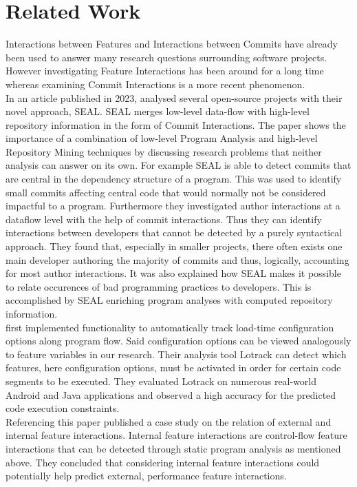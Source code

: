 \section*{Related Work}\label{ch:relatedwork}

Interactions between Features and Interactions between Commits have already been used to answer many research questions surrounding software projects.
However investigating Feature Interactions has been around for a long time whereas examining Commit Interactions is a more recent phenomenon. \\
In an article published in 2023, \citet{sattler2023seal} analysed several open-source projects with their novel approach, SEAL.
SEAL merges low-level data-flow with high-level repository information in the form of Commit Interactions.
The paper shows the importance of a combination of low-level Program Analysis and high-level Repository Mining techniques by discussing research problems that neither analysis can answer on its own.
For example SEAL is able to detect commits that are central in the dependency structure of a program.
This was used to identify small commits affecting central code that would normally not be considered impactful to a program.
Furthermore they investigated author interactions at a dataflow level with the help of commit interactions.
Thus they can identify interactions between developers that cannot be detected by a purely syntactical approach.
They found that, especially in smaller projects, there often exists one main developer authoring the majority of commits and thus, logically, accounting for most author interactions. 
It was also explained how SEAL makes it possible to relate occurences of bad programming practices to developers. 
This is accomplished by SEAL enriching program analyses with computed repository information. \\
\citet{lillack2014tracking} first implemented functionality to automatically track load-time configuration options along program flow.
Said configuration options can be viewed analogously to feature variables in our research. 
Their analysis tool Lotrack can detect which features, here configuration options, must be activated in order for certain code segments to be executed.
They evaluated Lotrack on numerous real-world Android and Java applications and observed a high accuracy for the predicted code execution constraints. \\
Referencing this paper \citet{kolesnikov2017relation} published a case study on the relation of external and internal feature interactions.
Internal feature interactions are control-flow feature interactions that can be detected through static program analysis as mentioned above.
They concluded that considering internal feature interactions could potentially help predict external, performance feature interactions.


